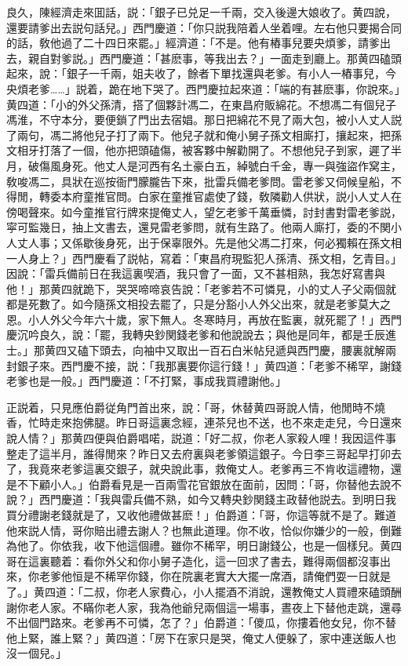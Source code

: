 良久，陳經濟走來囬話，説：「銀子已兑足一千兩，交入後邊大娘收了。黄四說，還要請爹出去説句話兒。」西門慶道：「你只説我陪着人坐着哩。左右他只要揭合同的話，敎他過了二十四日來罷。」經濟道：「不是。他有樁事兒要央煩爹，請爹出去，親自對爹説。」西門慶道：「甚麽事，等我出去？」一面走到廳上。那黄四磕頭起來，說：「銀子一千兩，姐夫收了，餘者下單找還與老爹。有小人一樁事兒，今央煩老爹……」説着，跪在地下哭了。西門慶拉起來道：「端的有甚麽事，你說來。」黄四道：「小的外父孫清，搭了個夥計馮二，在東昌府販綿花。不想馮二有個兒子馮淮，不守本分，要便鎖了門出去宿娼。那日把綿花不見了兩大包，被小人丈人説了兩句，馮二將他兒子打了兩下。他兒子就和俺小舅子孫文相廝打，攘起來，把孫文相牙打落了一個，他亦把頭磕傷，被客夥中解勸開了。不想他兒子到家，遲了半月，破傷風身死。他丈人是河西有名土豪白五，綽號白千金，專一與強盜作窝主，敎唆馮二，具狀在巡按衙門朦朧告下來，批雷兵備老爹問。雷老爹又伺候皇船，不得閒，轉委本府童推官問。白家在童推官處使了錢，敎隣勸人供狀，説小人丈人在傍喝聲來。如今童推官行牌來提俺丈人，望乞老爹千萬垂憐，討封書對雷老爹説，寜可監幾日，抽上文書去，還見雷老爹問，就有生路了。他兩人廝打，委的不関小人丈人事；又係歇後身死，出于保辜限外。先是他父馮二打來，何必獨賴在孫文相一人身上？」西門慶看了説帖，寫着：「東昌府現監犯人孫清、孫文相，乞青目。」因說：「雷兵備前日在我這裏喫酒，我只會了一面，又不甚相熟，我怎好寫書與他！」那黄四就跪下，哭哭啼啼哀告說：「老爹若不可憐見，小的丈人子父兩個就都是死數了。如今隨孫文相投去罷了，只是分豁小人外父出來，就是老爹莫大之恩。小人外父今年六十歲，家下無人。冬寒時月，再放在監裏，就死罷了！」西門慶沉吟良久，說：「罷，我轉央鈔関錢老爹和他說說去；與他是同年，都是壬辰進士。」那黄四又磕下頭去，向袖中又取出一百石白米帖兒遞與西門慶，腰裏就解兩封銀子來。西門慶不接，説：「我那裏要你這行錢！」黄四道：「老爹不稀罕，謝錢老爹也是一般。」西門慶道：「不打緊，事成我買禮謝他。」

正説着，只見應伯爵従角門首出來，說：「哥，休替黄四哥說人情，他閒時不燒香，忙時走來抱佛腿。昨日哥這裏念經，連茶兒也不送，也不來走走兒，今日還來說人情？」那黄四便與伯爵唱喏，説道：「好二叔，你老人家殺人哩！我因這件事整走了這半月，誰得閒來？昨日又去府裏與老爹領這銀子。今日李三哥起早打卯去了，我竟來老爹這裏交銀子，就央說此事，救俺丈人。老爹再三不肯收這禮物，還是不下顧小人。」伯爵看見是一百兩雪花官銀放在面前，因問：「哥，你替他去說不說？」西門慶道：「我與雷兵備不熟，如今又轉央鈔関錢主政替他説去。到明日我買分禮謝老錢就是了，又收他禮做甚麽！」伯爵道：「哥，你這等就不是了。難道他來説人情，哥你賠出禮去謝人？也無此道理。你不收，恰似你嫌少的一般，倒難為他了。你依我，收下他這個禮。雖你不稀罕，明日謝錢公，也是一個樣兒。黄四哥在這裏聽着：看你外父和你小舅子造化，這一回求了書去，難得兩個都沒事出來，你老爹他恒是不稀罕你錢，你在院裏老實大大擺一席酒，請俺們耍一日就是了。」黄四道：「二叔，你老人家費心，小人擺酒不消說，還教俺丈人買禮來磕頭酬謝你老人家。不瞞你老人家，我為他爺兒兩個這一場事，晝夜上下替他走跳，還尋不出個門路來。老爹再不可憐，怎了？」伯爵道：「儍瓜，你摟着他女兒，你不替他上緊，誰上緊？」黄四道：「房下在家只是哭，俺丈人便躲了，家中連送飯人也沒一個兒。」

